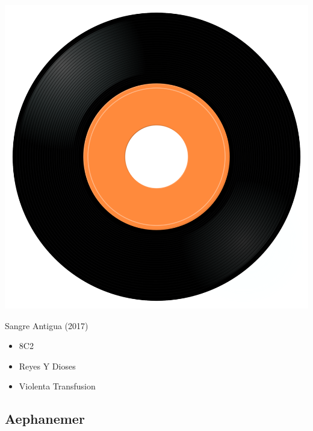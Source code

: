 \begin{minipage}[t]{0.25\textwidth}\vspace{0pt}
\captionsetup{type=figure}
\includegraphics[width=\textwidth]{Images/cover.png}
\caption*{Sangre Antigua (2017)}
\end{minipage}
\begin{minipage}[t]{0.25\textwidth}\vspace{0pt}
\begin{itemize}[nosep,leftmargin=1em,labelwidth=*,align=left]
	\setlength{\itemsep}{0pt}
	\item 8C2
	\item Reyes Y Dioses
	\item Violenta Transfusion
\end{itemize}
\end{minipage}

\subsection{Aephanemer}

